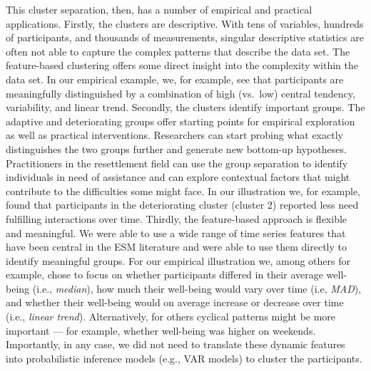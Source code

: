 \documentclass[man, 12pt, a4paper, floatsintext]{apa7}
\theoremstyle{break}
\theoremstyle{plain}
\begin{document}
This cluster separation, then, has a number of empirical and practical
applications. Firstly, the clusters are descriptive. With tens of
variables, hundreds of participants, and thousands of measurements,
singular descriptive statistics are often not able to capture the
complex patterns that describe the data set. The feature-based
clustering offers some direct insight into the complexity within the
data set. In our empirical example, we, for example, see that
participants are meaningfully distinguished by a combination of high
(vs.~low) central tendency, variability, and linear trend. Secondly, the
clusters identify important groups. The adaptive and deteriorating
groups offer starting points for empirical exploration as well as
practical interventions. Researchers can start probing what exactly
distinguishes the two groups further and generate new bottom-up
hypotheses. Practitioners in the resettlement field can use the group
separation to identify individuals in need of assistance and can explore
contextual factors that might contribute to the difficulties some might
face. In our illustration we, for example, found that participants in
the deteriorating cluster (cluster 2) reported less need fulfilling
interactions over time. Thirdly, the feature-based approach is flexible
and meaningful. We were able to use a wide range of time series features
that have been central in the ESM literature and were able to use them
directly to identify meaningful groups. For our empirical illustration
we, among others for example, chose to focus on whether participants
differed in their average well-being (i.e., \textit{median}), how much
their well-being would vary over time (i.e, \textit{MAD}), and whether
their well-being would on average increase or decrease over time (i.e.,
\textit{linear trend}). Alternatively, for others cyclical patterns
might be more important --- for example, whether well-being was higher
on weekends. Importantly, in any case, we did not need to translate
these dynamic features into probabilistic inference models (e.g., VAR
models) to cluster the participants.
\end{document}
